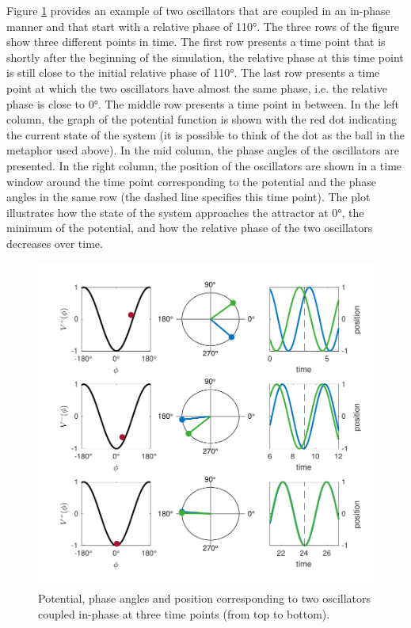 Figure \ref{fig:coupled_oscillators} provides an example of two oscillators that are coupled in an in-phase manner and that start with a relative phase of 110°. The three rows of the figure show three different points in time. The first row presents a time point that is shortly after the beginning of the simulation, the relative phase at this time point is still close to the initial relative phase of 110°. The last row presents a time point at which the two oscillators have almost the same phase, i.e. the relative phase is close to 0°. The middle row presents a time point in between. In the left column, the graph of the potential function is shown with the red dot indicating the current state of the system (it is possible to think of the dot as the ball in the metaphor used above). In the mid column, the phase angles of the oscillators are presented. In the right column, the position of the oscillators are shown in a time window around the time point corresponding to the potential and the phase angles in the same row (the dashed line specifies this time point). The plot illustrates how the state of the system approaches the attractor at 0°, the minimum of the potential, and how the relative phase of the two oscillators decreases over time. 

\begin{figure}[t]
\includegraphics[width=\textwidth]{figures/ch3/coupled_oscillators.pdf}
\caption[Potential, phase angles and position corresponding to two oscillators coupled in-phase]{Potential, phase angles and position corresponding to two oscillators coupled in-phase at three time points (from top to bottom).}
\label{fig:coupled_oscillators}
\end{figure}

